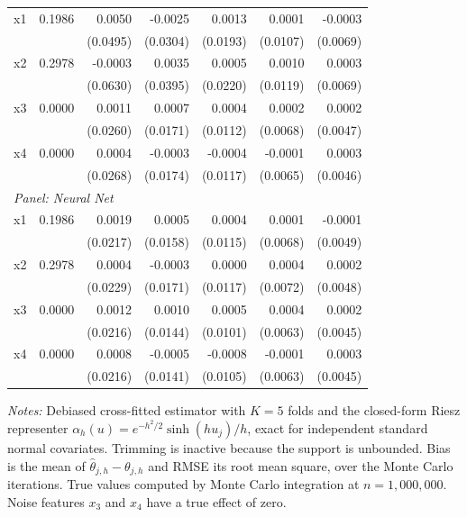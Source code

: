 \documentclass[12pt]{article}
\begin{document}
\begin{table}[htbp]
\begin{threeparttable}
\begin{tabular}{lrrrrrr}
				\quad x1 & 0.1986 & 0.0050 & -0.0025 & 0.0013 & 0.0001 & -0.0003 \\
				&  & (0.0495) & (0.0304) & (0.0193) & (0.0107) & (0.0069) \\
				\quad x2 & 0.2978 & -0.0003 & 0.0035 & 0.0005 & 0.0010 & 0.0003 \\
				&  & (0.0630) & (0.0395) & (0.0220) & (0.0119) & (0.0069) \\
				\quad x3 & 0.0000 & 0.0011 & 0.0007 & 0.0004 & 0.0002 & 0.0002 \\
				&  & (0.0260) & (0.0171) & (0.0112) & (0.0068) & (0.0047) \\
				\quad x4 & 0.0000 & 0.0004 & -0.0003 & -0.0004 & -0.0001 & 0.0003 \\
				&  & (0.0268) & (0.0174) & (0.0117) & (0.0065) & (0.0046) \\
				\midrule
				\multicolumn{7}{l}{\textit{Panel: Neural Net}} \\
				\quad x1 & 0.1986 & 0.0019 & 0.0005 & 0.0004 & 0.0001 & -0.0001 \\
				&  & (0.0217) & (0.0158) & (0.0115) & (0.0068) & (0.0049) \\
				\quad x2 & 0.2978 & 0.0004 & -0.0003 & 0.0000 & 0.0004 & 0.0002 \\
				&  & (0.0229) & (0.0171) & (0.0117) & (0.0072) & (0.0048) \\
				\quad x3 & 0.0000 & 0.0012 & 0.0010 & 0.0005 & 0.0004 & 0.0002 \\
				&  & (0.0216) & (0.0144) & (0.0101) & (0.0063) & (0.0045) \\
				\quad x4 & 0.0000 & 0.0008 & -0.0005 & -0.0008 & -0.0001 & 0.0003 \\
				&  & (0.0216) & (0.0141) & (0.0105) & (0.0063) & (0.0045) \\
				\bottomrule
				\end{tabular}
				\begin{tablenotes}
				\footnotesize
				\item \textit{Notes:} Debiased cross-fitted estimator with $K=5$ folds and the closed-form Riesz representer $\alpha_h(u) = e^{-h^2/2}\sinh(h u_j)/h$, exact for independent standard normal covariates. Trimming is inactive because the support is unbounded. Bias is the mean of $\hat{\theta}_{j,h} - \theta_{j,h}$ and RMSE its root mean square, over the Monte Carlo iterations. True values computed by Monte Carlo integration at $n=1{,}000{,}000$. Noise features $x_3$ and $x_4$ have a true effect of zero.
				\end{tablenotes}
		\end{threeparttable}
	\end{table}
	
\end{document}
